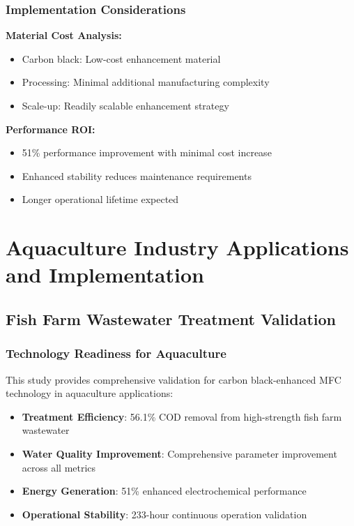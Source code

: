 \documentclass[12pt,a4paper]{article}
\begin{document}
\subsubsection{Implementation Considerations}

\textbf{Material Cost Analysis:}
\begin{itemize}
    \item Carbon black: Low-cost enhancement material
    \item Processing: Minimal additional manufacturing complexity
    \item Scale-up: Readily scalable enhancement strategy
\end{itemize}

\textbf{Performance ROI:}
\begin{itemize}
    \item 51\% performance improvement with minimal cost increase
    \item Enhanced stability reduces maintenance requirements
    \item Longer operational lifetime expected
\end{itemize}

\section{Aquaculture Industry Applications and Implementation}

\subsection{Fish Farm Wastewater Treatment Validation}

\subsubsection{Technology Readiness for Aquaculture}

This study provides comprehensive validation for carbon black-enhanced MFC technology in aquaculture applications:
\begin{itemize}
    \item \textbf{Treatment Efficiency}: 56.1\% COD removal from high-strength fish farm wastewater
    \item \textbf{Water Quality Improvement}: Comprehensive parameter improvement across all metrics
    \item \textbf{Energy Generation}: 51\% enhanced electrochemical performance
    \item \textbf{Operational Stability}: 233-hour continuous operation validation
\end{itemize}
\end{document}
